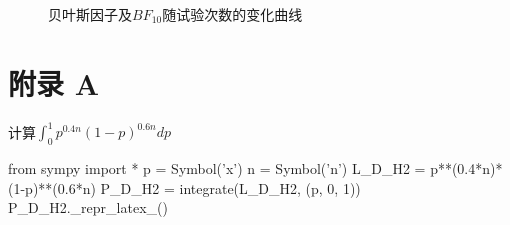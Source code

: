 \documentclass[stu,12pt,floatsintext]{apa7} %
\begin{document}
\begin{enumerate}[itemsep=2pt,topsep=0pt,parsep=0pt,label=(\alph*)]
    \begin{figure}[htb]
        \centering
        \hfill
        \caption{贝叶斯因子及\(BF_{10}\)随试验次数的变化曲线}
        \vspace{-2em}
    \end{figure}
    

\end{enumerate}

\appendix

\raggedright

\section{附录 A}

\noindent 计算\(\int_0^1 p^{0.4n} (1-p)^{0.6n} dp\)
\label{code1}
\begin{python}
    from sympy import *
    p = Symbol('x')
    n = Symbol('n')
    L_D_H2 = p**(0.4*n)*(1-p)**(0.6*n)
    P_D_H2 = integrate(L_D_H2, (p, 0, 1))
    P_D_H2._repr_latex_()
\end{python}
\end{document}
